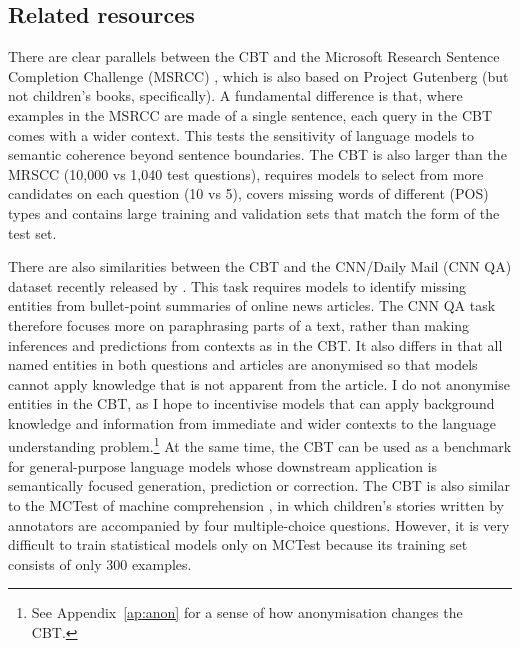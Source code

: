  


\subsection{Related resources}
There are clear parallels between the CBT and the Microsoft Research Sentence Completion Challenge (MSRCC) \citep{zweig2011microsoft}, which is also based on Project Gutenberg (but not children's books, specifically). A fundamental difference is that, where examples in the MSRCC are made of a single sentence, each query in the CBT comes with a wider context. This tests the sensitivity of language models to semantic coherence beyond sentence boundaries. The CBT is also larger than the MRSCC (10,000 vs 1,040 test questions), requires models to select from more candidates on each question (10 vs 5), covers missing words of different (POS) types and contains large training and validation sets that match the form of the test set. 

There are also similarities between the CBT and the CNN/Daily Mail (CNN QA) dataset recently released by \cite{nips15_hermann}. This task requires models to identify missing entities from bullet-point summaries of online news articles. The CNN QA task therefore focuses more on paraphrasing parts of a text, rather than making inferences and predictions from contexts as in the CBT. It also differs in that all named entities in both questions and articles are anonymised so that models cannot apply knowledge that is not apparent from the article. I do not anonymise entities in the CBT, as I hope to incentivise models that can apply background knowledge and information from immediate and wider contexts to the language understanding problem.\footnote{See Appendix~\ref{ap:anon} for a sense of how anonymisation changes the CBT.} At the same time, the CBT can be used as a benchmark for general-purpose language models whose downstream application is semantically focused generation, prediction or correction. 
%
The CBT is also similar to the MCTest of machine comprehension \citep{richardson2013mctest}, in which children's stories written by annotators are accompanied by four multiple-choice questions. However, it is very difficult to train statistical models only on MCTest because its training set consists of only 300 examples.

